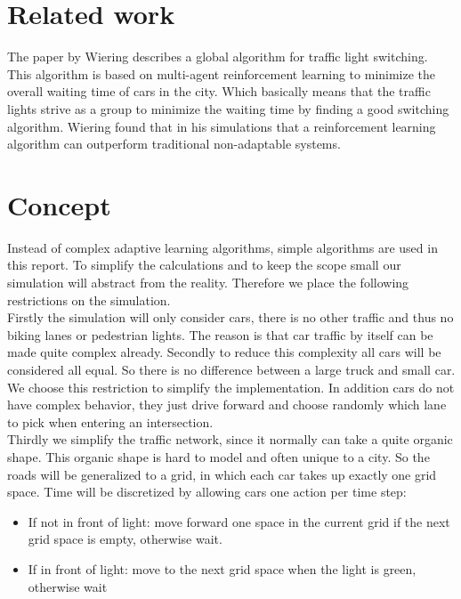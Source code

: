 \documentclass[a4paper,11pt]{article}
\begin{document}
\section{Related work}\label{sec:rel}

The paper by Wiering \cite{Wiering00} describes a global algorithm for traffic light switching.
This algorithm is based on multi-agent reinforcement learning to minimize the overall waiting time of cars in the city.
Which basically means that the traffic lights strive as a group to minimize the waiting time by finding a good switching algorithm.
Wiering found that in his simulations that a reinforcement learning algorithm can outperform traditional non-adaptable systems.

\section{Concept}\label{sec:concept}

Instead of complex adaptive learning algorithms, simple algorithms are used in this report.
To simplify the calculations and to keep the scope small our simulation will abstract from the reality.
Therefore we place the following restrictions on the simulation.\\

\noindent Firstly the simulation will only consider cars, there is no other traffic and thus no biking lanes or pedestrian lights.
The reason is that car traffic by itself can be made quite complex already.
Secondly to reduce this complexity all cars will be considered all equal.
So there is no difference between a large truck and small car.
We choose this restriction to simplify the implementation.
In addition cars do not have complex behavior, they just drive forward and choose randomly which lane to pick when entering an intersection.\\

\noindent Thirdly we simplify the traffic network, since it normally can take a quite organic shape.
This organic shape is hard to model and often unique to a city.
So the roads will be generalized to a grid, in which each car takes up exactly one grid space.
Time will be discretized by allowing cars one action per time step:
\begin{itemize}
 \item If not in front of light: move forward one space in the current grid if the next grid space is empty, otherwise wait.
 \item If in front of light: move to the next grid space when the light is green, otherwise wait
\end{itemize}
\end{document}
